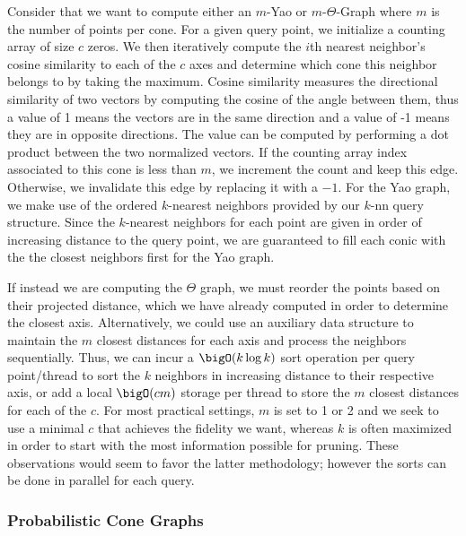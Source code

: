 Consider that we want to compute either an $m$-Yao or $m$-$\Theta$-Graph where $m$ is the number of points per cone.
%
For a given query point, we initialize a counting array of size $c$ zeros.
%
We then iteratively compute the $i$th nearest neighbor's cosine similarity to each of the $c$ axes and determine which cone this neighbor belongs to by taking the maximum.
%
Cosine similarity measures the directional similarity of two vectors by computing the cosine of the angle between them, thus a value of 1 means the vectors are in the same direction and a value of -1 means they are in opposite directions.
%
The value can be computed by performing a dot product between the two normalized vectors.
%
If the counting array index associated to this cone is less than $m$, we increment the count and keep this edge.
%
Otherwise, we invalidate this edge by replacing it with a $-1$.
%
For the Yao graph, we make use of the ordered $k$-nearest neighbors provided by our $k$-nn query structure.
%
Since the $k$-nearest neighbors for each point are given in order of increasing distance to the query point, we are guaranteed to fill each conic with the the closest neighbors first for the Yao graph.

If instead we are computing the $\Theta$ graph, we must reorder the points based on their projected distance, which we have already computed in order to determine the closest axis.
%
Alternatively, we could use an auxiliary data structure to maintain the $m$ closest distances for each axis and process the neighbors sequentially.
%
Thus, we can incur a $\bigO(k \log k)$ sort operation per query point/thread to sort the $k$ neighbors in increasing distance to their respective axis, or add a local $\bigO(cm)$ storage per thread to store the $m$ closest distances for each of the $c$.
%
For most practical settings, $m$ is set to 1 or 2 and we seek to use a minimal $c$ that achieves the fidelity we want, whereas $k$ is often maximized in order to start with the most information possible for pruning.
%
These observations would seem to favor the latter methodology; however the sorts can be done in parallel for each query.
%

\subsubsection{Probabilistic Cone Graphs}
\label{sec:probabilistic_cones}

